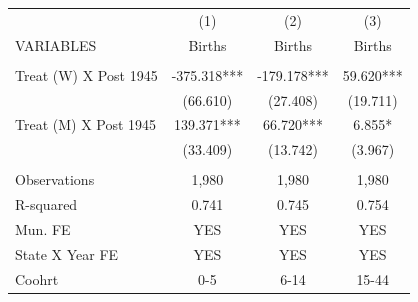 \begin{tabular}{lccc} \hline
 & (1) & (2) & (3) \\
VARIABLES & Births & Births & Births \\ \hline
 &  &  &  \\
Treat (W) X Post 1945 & -375.318*** & -179.178*** & 59.620*** \\
 & (66.610) & (27.408) & (19.711) \\
Treat (M) X Post 1945 & 139.371*** & 66.720*** & 6.855* \\
 & (33.409) & (13.742) & (3.967) \\
 &  &  &  \\
Observations & 1,980 & 1,980 & 1,980 \\
R-squared & 0.741 & 0.745 & 0.754 \\
Mun. FE & YES & YES & YES \\
State X Year FE & YES & YES & YES \\
 Coohrt & 0-5 & 6-14 & 15-44 \\ \hline
\end{tabular}
